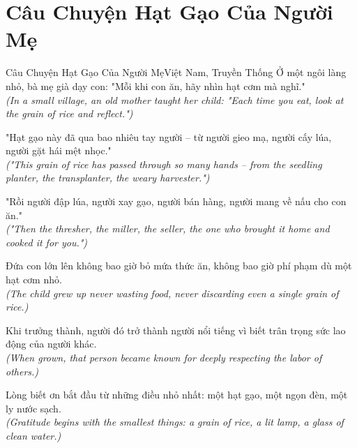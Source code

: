 \section{Câu Chuyện Hạt Gạo Của Người Mẹ}
\begin{truyen}{Câu Chuyện Hạt Gạo Của Người Mẹ}{Việt Nam, Truyền Thống}
Ở một ngôi làng nhỏ, bà mẹ già dạy con: "Mỗi khi con ăn, hãy nhìn hạt cơm mà nghĩ."\\
\textit{(In a small village, an old mother taught her child: "Each time you eat, look at the grain of rice and reflect.")}

"Hạt gạo này đã qua bao nhiêu tay người -- từ người gieo mạ, người cấy lúa, người gặt hái mệt nhọc."\\
\textit{("This grain of rice has passed through so many hands -- from the seedling planter, the transplanter, the weary harvester.")}

"Rồi người đập lúa, người xay gạo, người bán hàng, người mang về nấu cho con ăn."\\
\textit{("Then the thresher, the miller, the seller, the one who brought it home and cooked it for you.")}

Đứa con lớn lên không bao giờ bỏ mứa thức ăn, không bao giờ phí phạm dù một hạt cơm nhỏ.\\
\textit{(The child grew up never wasting food, never discarding even a single grain of rice.)}

Khi trưởng thành, người đó trở thành người nổi tiếng vì biết trân trọng sức lao động của người khác.\\
\textit{(When grown, that person became known for deeply respecting the labor of others.)}

\end{truyen}
\begin{baihoc}
  Lòng biết ơn bắt đầu từ những điều nhỏ nhất: một hạt gạo, một ngọn đèn, một ly nước sạch.\\
  \textit{(Gratitude begins with the smallest things: a grain of rice, a lit lamp, a glass of clean water.)}
\end{baihoc}

